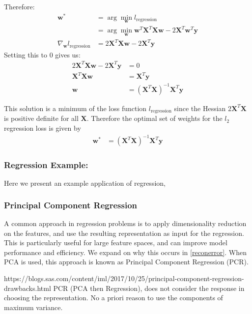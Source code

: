  Therefore: 
\begin{align*}
    \mathbf{w}^* &= \arg \min_{\mathbf{w}}l_{\mathrm{regression}} \\ 
    &= \arg \min_{\mathbf{w}} \mathbf{w}^T\mathbf{X}^T \mathbf{X}\mathbf{w}  - 2\mathbf{X}^T\mathbf{w}^T\mathbf{y} \\
    \nabla_{\mathbf{w}} l_{\mathrm{regression}} &= 2
\mathbf{X}^T \mathbf{X}\mathbf{w} - 2\mathbf{X}^T\mathbf{y}
\end{align*}
Setting this to $0$ gives us:
\begin{align*}
2
\mathbf{X}^T \mathbf{X}\mathbf{w} - 2\mathbf{X}^T\mathbf{y} &= 0 \\
\mathbf{X}^T \mathbf{X}\mathbf{w} &= \mathbf{X}^T\mathbf{y} \\
\mathbf{w} &= (\mathbf{X}^T \mathbf{X})^{-1}\mathbf{X}^T\mathbf{y}
\end{align*}

This solution is a minimum of the loss function $l_{\mathrm{regression}}$ since the Hessian $2\mathbf{X}^T\mathbf{X}$ is positive definite for all $\mathbf{X}$. Therefore the optimal set of weights for the $l_2$ regression loss is given by 
\begin{align}
    \mathbf{w}^* &= (\mathbf{X}^T \mathbf{X})^{-1}\mathbf{X}^T\mathbf{y}
\end{align}

\subsubsection{Regression Example: }
Here we present an example application of regression, 



\subsubsection{Principal Component Regression}
A common approach in regression problems is to apply dimensionality reduction on the features, and use the resulting representation as input for the regression. This is particularly useful for large feature spaces, and can improve model performance and efficiency. We expand on why this occurs in \ref{reconerror}. When PCA is used, this approach is known as Principal Component Regression (PCR). 


https://blogs.sas.com/content/iml/2017/10/25/principal-component-regression-drawbacks.html
PCR (PCA then Regression), does not consider the response in choosing the representation. No a priori reason to use the components of maximum variance.

